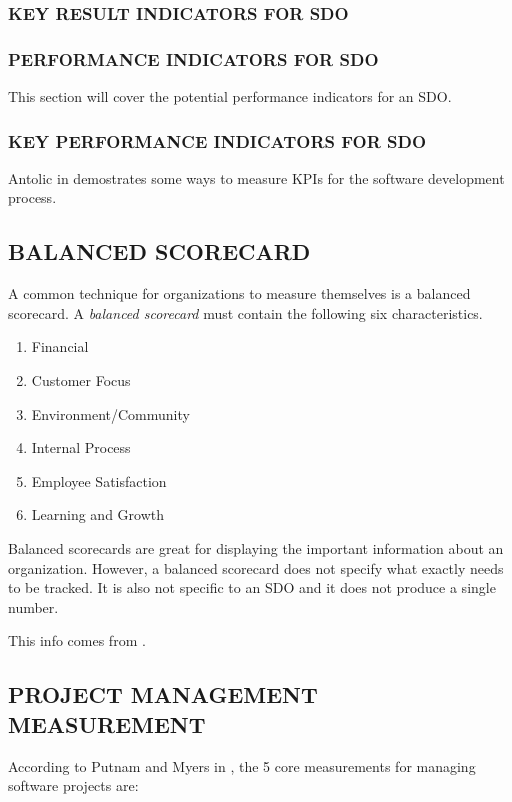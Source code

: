 \documentclass[SDSUThesis.tex]{subfiles}
\begin{document}
        \subsubsection{KEY RESULT INDICATORS FOR SDO}
        
        \subsubsection{PERFORMANCE INDICATORS FOR SDO}
            This section will cover the potential performance indicators for an SDO.
            
        \subsubsection{KEY PERFORMANCE INDICATORS FOR SDO}
        
        Antolic in \cite{Antolic2008} demostrates some ways to measure KPIs for the  software development process.
    
    \subsection{BALANCED SCORECARD}
    
        A common technique for organizations to measure themselves is a balanced scorecard.
        A \textit{balanced scorecard} must contain the following six
        characteristics.
        \begin{enumerate}
          \item Financial 
          \item Customer Focus
          \item Environment/Community
          \item Internal Process
          \item Employee Satisfaction
          \item Learning and Growth
        \end{enumerate}
        
        Balanced scorecards are great for displaying the important information about
        an organization.  However, a balanced scorecard does not specify what
        exactly needs to be tracked.  It is also not specific to an SDO and 
        it does not produce a single number.
        
        This info comes from \cite{parmenter2010}.

    \subsection{PROJECT MANAGEMENT MEASUREMENT}
    According to Putnam and Myers in \cite{Putnam2013}, the 5 core measurements for managing software
    projects are:
    
\end{document}
